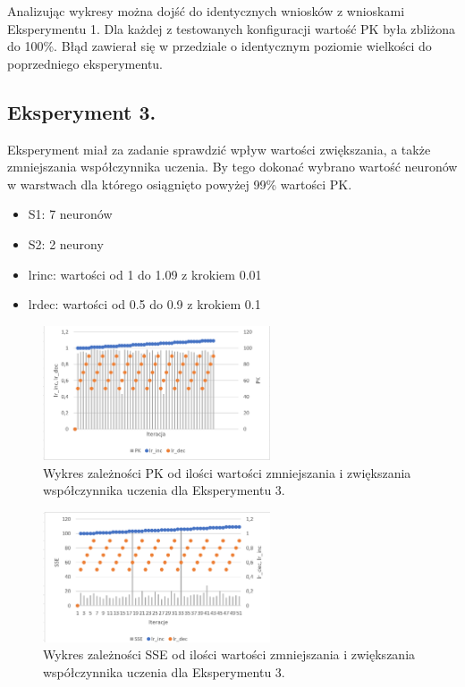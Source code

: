 \documentclass[a4paper, openright, twoside,11pt]{article}
\begin{document}
        Analizując wykresy można dojść do identycznych wniosków z wnioskami Eksperymentu 1. Dla każdej z testowanych konfiguracji wartość PK była zbliżona do 100\%. Błąd zawierał się w przedziale o identycznym poziomie wielkości do poprzedniego eksperymentu.
    \clearpage    
    \subsection{Eksperyment 3.}
    Eksperyment miał za zadanie sprawdzić wpływ wartości zwiększania, a także zmniejszania współczynnika uczenia. By tego dokonać wybrano wartość neuronów w warstwach dla którego osiągnięto powyżej 99\% wartości PK.
     \begin{itemize}
        \item S1: 7 neuronów
        \item S2: 2 neurony
        \item lr\textunderscore inc: wartości od 1 do 1.09 z krokiem 0.01
        \item lr\textunderscore dec: wartości od 0.5 do 0.9 z krokiem 0.1
       \end{itemize}
       \begin{figure}[!h]
            \centering
            \includegraphics[width = 0.6\textwidth]{Grafika/eksperymenty/pk3.png}
            \caption {Wykres zależności PK od ilości wartości zmniejszania i zwiększania współczynnika uczenia dla Eksperymentu 3.}
            \label{fig:PKeksperyment3}
        \end{figure}
        \begin{figure}[!h]
            \centering
            \includegraphics[width = 0.6\textwidth]{Grafika/eksperymenty/sse3.png}
            \caption {Wykres zależności SSE od ilości wartości zmniejszania i zwiększania współczynnika uczenia dla Eksperymentu 3.}
            \label{fig:PKeksperyment3}
        \end{figure}   
\end{document}
